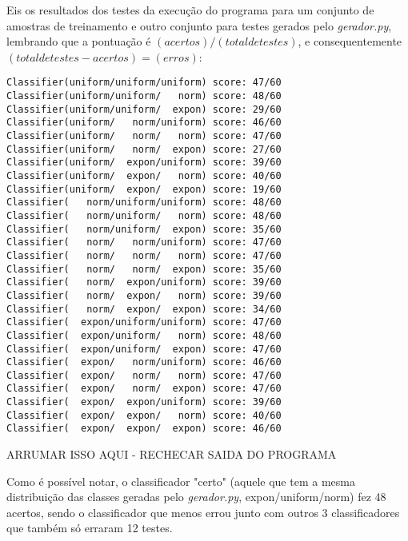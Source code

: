 \documentclass[a4paper,11pt]{article}
\begin{document}
Eis os resultados dos testes da execução do programa para um conjunto de amostras de treinamento e outro conjunto para testes gerados
pelo \textit{gerador.py}, lembrando que a pontuação é $(acertos)/(total de testes)$, e consequentemente $(total de
testes - acertos) = (erros)$:\\
\begin{verbatim}
Classifier(uniform/uniform/uniform)	score: 47/60
Classifier(uniform/uniform/   norm)	score: 48/60
Classifier(uniform/uniform/  expon)	score: 29/60
Classifier(uniform/   norm/uniform)	score: 46/60
Classifier(uniform/   norm/   norm)	score: 47/60
Classifier(uniform/   norm/  expon)	score: 27/60
Classifier(uniform/  expon/uniform)	score: 39/60
Classifier(uniform/  expon/   norm)	score: 40/60
Classifier(uniform/  expon/  expon)	score: 19/60
Classifier(   norm/uniform/uniform)	score: 48/60
Classifier(   norm/uniform/   norm)	score: 48/60
Classifier(   norm/uniform/  expon)	score: 35/60
Classifier(   norm/   norm/uniform)	score: 47/60
Classifier(   norm/   norm/   norm)	score: 47/60
Classifier(   norm/   norm/  expon)	score: 35/60
Classifier(   norm/  expon/uniform)	score: 39/60
Classifier(   norm/  expon/   norm)	score: 39/60
Classifier(   norm/  expon/  expon)	score: 34/60
Classifier(  expon/uniform/uniform)	score: 47/60
Classifier(  expon/uniform/   norm)	score: 48/60
Classifier(  expon/uniform/  expon)	score: 47/60
Classifier(  expon/   norm/uniform)	score: 46/60
Classifier(  expon/   norm/   norm)	score: 47/60
Classifier(  expon/   norm/  expon)	score: 47/60
Classifier(  expon/  expon/uniform)	score: 39/60
Classifier(  expon/  expon/   norm)	score: 40/60
Classifier(  expon/  expon/  expon)	score: 46/60
\end{verbatim}
ARRUMAR ISSO AQUI - RECHECAR SAIDA DO PROGRAMA

Como é possível notar, o classificador "certo" (aquele que tem a mesma distribuição das classes geradas pelo \textit{gerador.py}, expon/uniform/norm)
fez 48 acertos, sendo o classificador que menos errou junto com outros 3 classificadores que também só erraram 12 testes.
\end{document}
